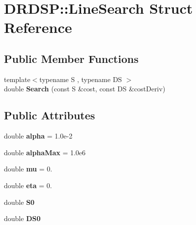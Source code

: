 \hypertarget{struct_d_r_d_s_p_1_1_line_search}{\section{D\-R\-D\-S\-P\-:\-:Line\-Search Struct Reference}
\label{struct_d_r_d_s_p_1_1_line_search}
}
\subsection*{Public Member Functions}
\begin{DoxyCompactItemize}
\item 
\hypertarget{struct_d_r_d_s_p_1_1_line_search_a7d80d01ce81c417f4246a348ea115c2f}{{\footnotesize template$<$typename S , typename D\-S $>$ }\\double {\bfseries Search} (const S \&cost, const D\-S \&cost\-Deriv)}\label{struct_d_r_d_s_p_1_1_line_search_a7d80d01ce81c417f4246a348ea115c2f}

\end{DoxyCompactItemize}
\subsection*{Public Attributes}
\begin{DoxyCompactItemize}
\item 
\hypertarget{struct_d_r_d_s_p_1_1_line_search_aa1b9be6dd476ea782296caf27fc87bcd}{double {\bfseries alpha} = 1.\-0e-\/2}\label{struct_d_r_d_s_p_1_1_line_search_aa1b9be6dd476ea782296caf27fc87bcd}

\item 
\hypertarget{struct_d_r_d_s_p_1_1_line_search_a79d6f5eaed56fd506b1d8a8f687d54a9}{double {\bfseries alpha\-Max} = 1.\-0e6}\label{struct_d_r_d_s_p_1_1_line_search_a79d6f5eaed56fd506b1d8a8f687d54a9}

\item 
\hypertarget{struct_d_r_d_s_p_1_1_line_search_a48ee96d436216a66de45a13d700fcdaa}{double {\bfseries mu} = 0.}\label{struct_d_r_d_s_p_1_1_line_search_a48ee96d436216a66de45a13d700fcdaa}

\item 
\hypertarget{struct_d_r_d_s_p_1_1_line_search_ad1e2b29ad51dd189d3631fad059ec5d9}{double {\bfseries eta} = 0.}\label{struct_d_r_d_s_p_1_1_line_search_ad1e2b29ad51dd189d3631fad059ec5d9}

\item 
\hypertarget{struct_d_r_d_s_p_1_1_line_search_a3bb00fed00ecf84072fc6af165be2776}{double {\bfseries S0}}\label{struct_d_r_d_s_p_1_1_line_search_a3bb00fed00ecf84072fc6af165be2776}

\item 
\hypertarget{struct_d_r_d_s_p_1_1_line_search_ad76f45369c080f3d44f1daaf96114fe2}{double {\bfseries D\-S0}}\label{struct_d_r_d_s_p_1_1_line_search_ad76f45369c080f3d44f1daaf96114fe2}

\end{DoxyCompactItemize}

